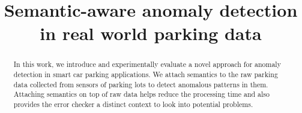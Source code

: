 \documentclass[10pt]{sigplanconf}
\begin{document}
\setlength{\pdfpageheight}{\paperheight}
\setlength{\pdfpagewidth}{\paperwidth}






\title{Semantic-aware anomaly detection in real world parking data}



\maketitle

\begin{abstract}
In this work, we introduce and experimentally evaluate a novel approach for anomaly detection in smart car parking applications.  We attach semantics to the raw parking data collected from sensors of parking lots to detect anomalous patterns in them.  Attaching semantics on top of raw data helps reduce the processing time and also provides the error checker a distinct context to look into potential problems.
\end{abstract}
\end{document}
